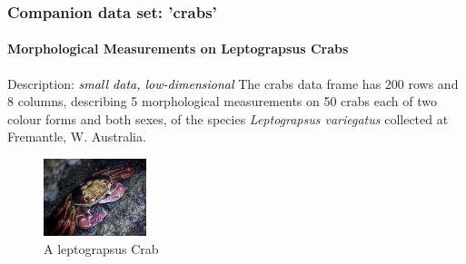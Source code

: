 \documentclass{beamer}\usepackage[]{graphicx}\usepackage[]{color}
\begin{document}
\begin{frame}[fragile]
  \frametitle{Companion data set: 'crabs'}
  \framesubtitle{Morphological Measurements on Leptograpsus Crabs}

\begin{block}{Description: \textcolor{black}{\it small data, low-dimensional}}
\small The crabs data frame has 200 rows and 8 columns, describing 5 morphological measurements on 50 crabs each of two colour forms and both sexes, of the species \textit{Leptograpsus variegatus} collected at Fremantle, W. Australia.\\
\end{block}

\begin{figure}
  \includegraphics[width=3cm]{crab}
  \caption{A leptograpsus Crab}
\end{figure}
\end{frame}
\end{document}
